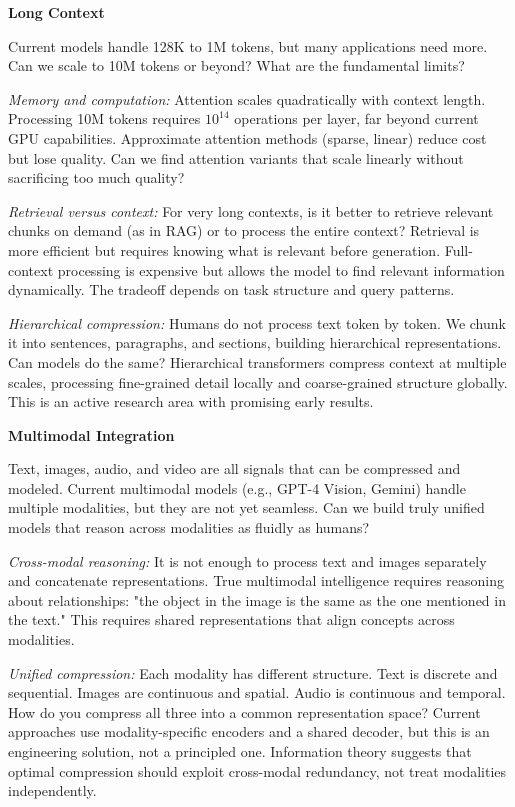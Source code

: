 \textbf{Long Context}

Current models handle 128K to 1M tokens, but many applications need more. Can we scale to 10M tokens or beyond? What are the fundamental limits?

\textit{Memory and computation:} Attention scales quadratically with context length. Processing 10M tokens requires $10^{14}$ operations per layer, far beyond current GPU capabilities. Approximate attention methods (sparse, linear) reduce cost but lose quality. Can we find attention variants that scale linearly without sacrificing too much quality?

\textit{Retrieval versus context:} For very long contexts, is it better to retrieve relevant chunks on demand (as in RAG) or to process the entire context? Retrieval is more efficient but requires knowing what is relevant before generation. Full-context processing is expensive but allows the model to find relevant information dynamically. The tradeoff depends on task structure and query patterns.

\textit{Hierarchical compression:} Humans do not process text token by token. We chunk it into sentences, paragraphs, and sections, building hierarchical representations. Can models do the same? Hierarchical transformers compress context at multiple scales, processing fine-grained detail locally and coarse-grained structure globally. This is an active research area with promising early results.

\vspace{0.5em}

\textbf{Multimodal Integration}

Text, images, audio, and video are all signals that can be compressed and modeled. Current multimodal models (e.g., GPT-4 Vision, Gemini) handle multiple modalities, but they are not yet seamless. Can we build truly unified models that reason across modalities as fluidly as humans?

\textit{Cross-modal reasoning:} It is not enough to process text and images separately and concatenate representations. True multimodal intelligence requires reasoning about relationships: "the object in the image is the same as the one mentioned in the text." This requires shared representations that align concepts across modalities.

\textit{Unified compression:} Each modality has different structure. Text is discrete and sequential. Images are continuous and spatial. Audio is continuous and temporal. How do you compress all three into a common representation space? Current approaches use modality-specific encoders and a shared decoder, but this is an engineering solution, not a principled one. Information theory suggests that optimal compression should exploit cross-modal redundancy, not treat modalities independently.

